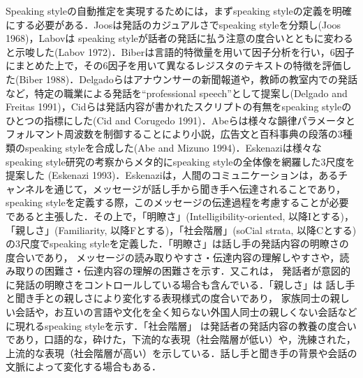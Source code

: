 \documentclass[japanese]{jnlp_1.4}
\begin{document}
Speaking styleの自動推定を実現するためには，まずspeaking styleの定義を明確にする必要がある．Joosは発話のカジュアルさでspeaking styleを分類し(Joos 1968)，Labovは speaking styleが話者の発話に払う注意の度合いとともに変わると示唆した(Labov 1972)．Biberは言語的特徴量を用いて因子分析を行い，6因子にまとめた上で，その6因子を用いて異なるレジスタのテキストの特徴を評価した(Biber 1988)．Delgadoらはアナウンサーの新聞報道や，教師の教室内での発話など，特定の職業による発話を``professional speech''として提案し(Delgado and Freitas 1991)，Cidらは発話内容が書かれたスクリプトの有無をspeaking styleのひとつの指標にした(Cid and Corugedo 1991)．Abeらは様々な韻律パラメータとフォルマント周波数を制御することにより小説，広告文と百科事典の段落の3種類のspeaking styleを合成した(Abe and Mizuno 1994)．Eskenaziは様々なspeaking style研究の考察からメタ的にspeaking styleの全体像を網羅した3尺度を提案した (Eskenazi 1993)．Eskenaziは，人間のコミュニケーションは，あるチャンネルを通じて，メッセージが話し手から聞き手へ伝達されることであり，speaking styleを定義する際，このメッセージの伝達過程を考慮することが必要であると主張した．その上で，「明瞭さ」(Intelligibility-oriented, 以降Iとする)，「親しさ」(Familiarity, 以降Fとする)，「社会階層」(soCial strata, 以降Cとする)の3尺度でspeaking styleを定義した．「明瞭さ」は話し手の発話内容の明瞭さの度合いであり， メッセージの読み取りやすさ・伝達内容の理解しやすさや，読み取りの困難さ・伝達内容の理解の困難さを示す．又これは， 発話者が意図的に発話の明瞭さをコントロールしている場合も含んでいる．「親しさ」は 話し手と聞き手との親しさにより変化する表現様式の度合いであり， 家族同士の親しい会話や，お互いの言語や文化を全く知らない外国人同士の親しくない会話などに現れるspeaking styleを示す．「社会階層」 は発話者の発話内容の教養の度合いであり，口語的な，砕けた，下流的な表現（社会階層が低い）や，洗練された，上流的な表現（社会階層が高い）を示している．話し手と聞き手の背景や会話の文脈によって変化する場合もある．
\end{document}
